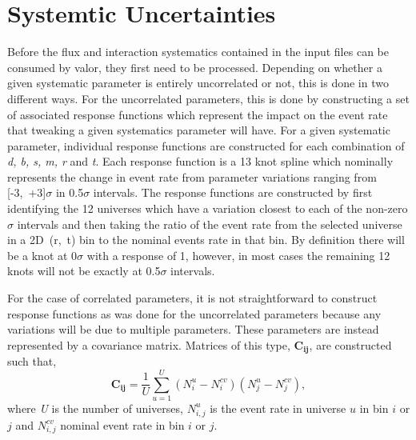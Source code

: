 \section{Systemtic Uncertainties}\label{sec:systematic_validation}
Before the flux and interaction systematics contained in the input files can be consumed by \gls{valor}, they first need to be processed. Depending on whether a given systematic parameter is entirely uncorrelated or not, this is done in two different ways. For the uncorrelated parameters, this is done by constructing a set of associated response functions which represent the impact on the event rate that tweaking a given systematics parameter will have. For a given systematic parameter, individual response functions are constructed for each combination of \textit{d, b, s, m, r} and \textit{t}. Each response function is a 13 knot spline which nominally represents the change in event rate from parameter variations ranging from \mbox{[-3, +3]$\sigma$} in 0.5$\sigma$ intervals. The response functions are constructed by first identifying the 12 universes which have a variation closest to each of the non-zero $\sigma$ intervals and then taking the ratio of the event rate from the selected universe in a \mbox{2D (r, t)} bin to the nominal events rate in that bin. By definition there will be a knot at 0$\sigma$ with a response of 1, however, in most cases the remaining 12 knots will not be exactly at 0.5$\sigma$ intervals. 

For the case of correlated parameters, it is not straightforward to construct response functions as was done for the uncorrelated parameters because any variations will be due to multiple parameters. These parameters are instead represented by a covariance matrix. Matrices of this type, $\mathbf{C_{ij}}$, are constructed such that,
\begin{equation}
  \mathbf{C_{ij}} = \frac{1}{U} \sum_{u=1}^{U} (N_{i}^{u}-N_{i}^{cv})(N_{j}^{u}-N_{j}^{cv}),
  \label{eq:covmatrix}
\end{equation}
where \textit{U} is the number of universes, $N_{i,j}^{u}$ is the event rate in universe $u$ in bin $i$ or $j$ and $N_{i,j}^{cv}$ nominal event rate in
bin $i$ or $j$.

